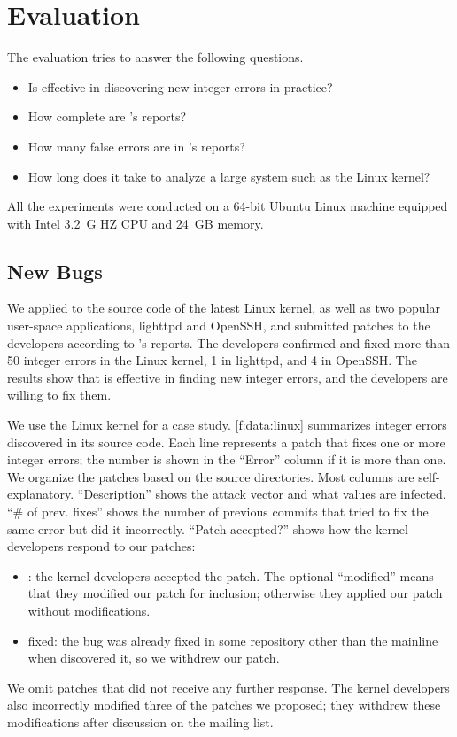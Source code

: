 \section{Evaluation}
\label{s:eval}

The evaluation tries to answer the following questions.
\begin{itemize}
\item
Is \sys effective in discovering new integer errors in practice?
\item
How complete are \sys's reports?
\item
How many false errors are in \sys's reports?
\item
How long does it take \sys to analyze a large system such
as the Linux kernel?
\end{itemize}

All the experiments were conducted on a 64-bit Ubuntu Linux machine
equipped with Intel 3.2~G HZ CPU and 24~GB memory.

\subsection{New Bugs}
\label{s:eval:linux}

We applied \sys to the source code of the latest Linux kernel,
as well as two popular user-space applications, lighttpd and OpenSSH,
and submitted patches to the developers according to \sys's reports.
The developers confirmed and fixed more than 50 integer errors in
the Linux kernel, 1 in lighttpd, and 4 in OpenSSH.
%
The results show that \sys is effective in finding new integer
errors, and the developers are willing to fix them.

We use the Linux kernel for a case study.  \autoref{f:data:linux}
summarizes integer errors \sys discovered in its source code.
Each line represents a patch that fixes one or more integer errors; the
number is shown in the ``Error'' column if it is more than one.  We
organize the patches based on the source directories.  Most
columns are self-explanatory.  ``Description'' shows the attack
vector and what values are infected.  ``\# of prev. fixes'' shows
the number of previous commits that tried to fix the same error but
did it incorrectly.  ``Patch accepted?'' shows how the kernel
developers respond to our patches:
\begin{itemize}
\item
\ok: the kernel developers accepted the patch.
The optional ``modified'' means that they modified our patch for inclusion;
otherwise they applied our patch without modifications.
\item
fixed: the bug was already fixed in some repository other than the
mainline when \sys discovered it, so we withdrew our patch.
\end{itemize}
We omit patches that did not receive any further response.
The kernel developers also incorrectly modified three of the patches
we proposed; they withdrew these modifications after discussion on the
mailing list.

